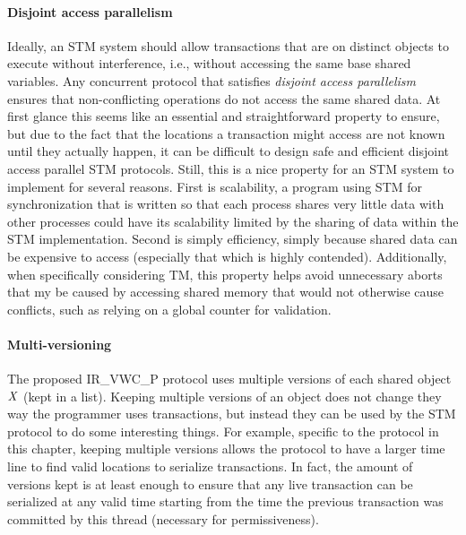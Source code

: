 \paragraph{Disjoint access parallelism}
Ideally, an  STM system should allow transactions that are on distinct 
objects to execute without interference, i.e., without accessing the same
base shared variables.
Any concurrent protocol that satisfies \emph{disjoint access parallelism} ensures that
non-conflicting operations do not access the same shared data.
At first glance this seems like an essential and straightforward property to ensure, but due to the
fact that the locations a transaction might access are not known until they actually happen,
it can be difficult to design safe and efficient disjoint access parallel STM protocols.
Still, this is a nice property for an STM system to implement for several reasons.
First is scalability, a program using STM for synchronization that is written so that each process shares
very little data with other processes could have its scalability limited by the sharing of data within
the STM implementation.
Second is simply efficiency, simply because shared data can be expensive to access
(especially that which is highly contended).
Additionally, when specifically considering TM, this property helps avoid unnecessary aborts that my be caused by accessing
shared memory that would not otherwise cause conflicts, such as relying on a global counter for validation.


\paragraph{Multi-versioning}
The  proposed IR\_VWC\_P  protocol  uses multiple  versions 
of each  shared object $\ms{X}$ (kept in a list).
Keeping multiple versions of an object does not change they way the programmer
uses transactions, but instead they can be used by the STM protocol to
do some interesting things.
For example, specific to the protocol in this chapter, keeping multiple
versions allows the protocol to have a larger time  line to find valid locations
to serialize transactions.
In fact, the amount of versions kept is at least enough to ensure that any
live transaction can be serialized at any valid time starting from the
time the previous transaction was committed by this thread
(necessary for permissiveness).

